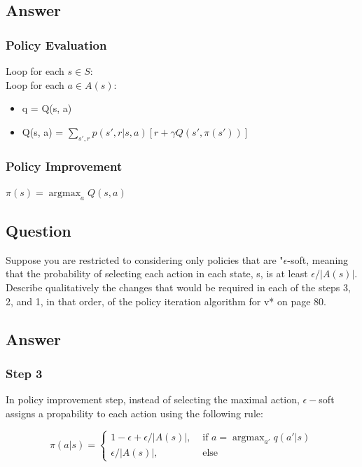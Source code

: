 \documentclass[11pt]{article}
\DeclareMathOperator*{\argmax}{argmax}
\begin{document}
    \subsection*{Answer}

    \subsubsection*{Policy Evaluation}
    Loop for each $ s \in S $: \\
    Loop for each $ a \in A(s) $: \\
    \begin{itemize}
    \item q = Q(s, a) \\
    \item  Q(s, a) = $ \sum_{s',r} p(s',r| s, a) [ r + \gamma Q(s', \pi(s'))  ] $
    \end{itemize}

    \subsubsection*{Policy Improvement}
    $ \pi(s) = \argmax_{a} Q(s, a) $

    \subsection{Question}

    Suppose you are restricted to considering only policies that are "$\epsilon$-soft, meaning that the probability of selecting each action in each state, s, is at least $\epsilon/|A(s)|$.
    Describe qualitatively the changes that would be required in each of the steps 3, 2, and 1, in that order, of the policy iteration algorithm for v* on page 80.

    \subsection*{Answer}

    \subsubsection*{Step 3}

    In policy improvement step, instead of selecting the maximal action, $ \epsilon-$soft assigns a propability to each action using the following rule:

    \begin{equation}
        \pi(a|s) =
        \begin{cases}
            1-\epsilon + \epsilon/|A(s)|,& \text{ if } a = \argmax_{a'}q(a'|s) \\
            \epsilon/|A(s)|,& \text{ else }
        \end{cases}
    \end{equation}
\end{document}
